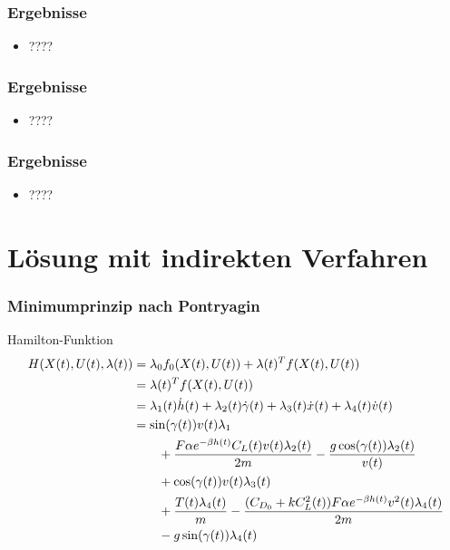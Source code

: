 \documentclass[aspectratio=169]{beamer}
\begin{document}
\begin{frame}
  \frametitle{Ergebnisse}
\vspace{-2.6cm}
  \begin{itemize}
    \item ????
  \end{itemize}
\end{frame}

\begin{frame}
  \frametitle{Ergebnisse}
\vspace{-2.6cm}
  \begin{itemize}
    \item ????
  \end{itemize}
\end{frame}

\begin{frame}
  \frametitle{Ergebnisse}
\vspace{-2.6cm}
  \begin{itemize}
    \item ????
  \end{itemize}
\end{frame}

\section{Lösung mit indirekten Verfahren}
\begin{frame}
  \frametitle{Minimumprinzip nach Pontryagin}
  \scriptsize
  \begin{block}{Hamilton-Funktion}  
 \begin{align*} 
        H(X(t),U(t),\lambda(t)) &= \lambda_0 f_0(X(t),U(t)) + \lambda(t)^T f(X(t),U(t)) \\\
        &= \lambda(t)^T f(X(t),U(t)) \\\
        &= \lambda_1(t) \dot{h}(t) + \lambda_2(t) \dot{\gamma}(t) + \lambda_3(t) \dot{x}(t) + \lambda_4(t) \dot{v}(t) \\\
        &= \sin(\gamma(t)) v(t) \lambda_1 \\\
        &\hspace{7mm} + \dfrac{F \alpha e^{-\beta h(t)} C_L(t) v(t) \lambda_2(t)}{2m} - \dfrac{g \cos(\gamma(t)) \lambda_2(t)}{v(t)} \\\
        &\hspace{7mm} + \cos(\gamma(t)) v(t) \lambda_3(t) \\\
        &\hspace{7mm} + \dfrac{T(t) \lambda_4(t)}{m} - \dfrac{(C_{D_0} + k C_L^2(t)) F \alpha e^{-\beta h(t)} v^2(t) \lambda_4(t)}{2m} \\\
        &\hspace{7mm} - g \sin(\gamma(t)) \lambda_4(t)
\end{align*}
\end{block}
\end{frame}
\end{document}
